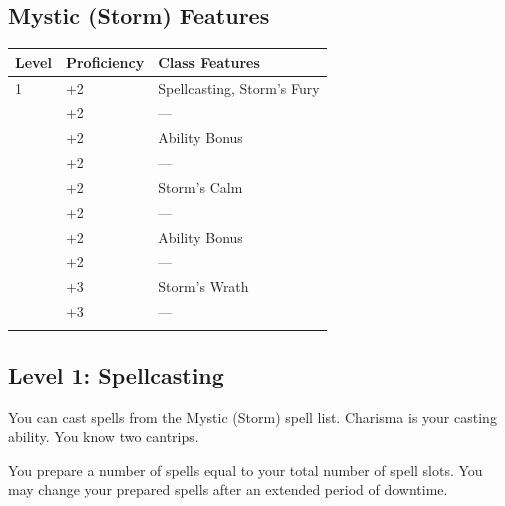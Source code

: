 \documentclass[12pt,letterpaper,twocolumn,openany,nodeprecatedcode,bg=none]{dndbook}
\let\oldsubsection\subsection
\renewcommand{\subsection}[1]{%
  \needspace{5\baselineskip}%
  \oldsubsection{#1}%
}
\begin{document}
\subsection{Mystic (Storm) Features}\label{mystic-storm-features}


{\def\LTcaptype{none} %
\begin{table}[!htbp]
\centering
\begin{tabular}{@{}
  >{\raggedright\arraybackslash}p{}
  >{\raggedright\arraybackslash}p{}
  >{\raggedright\arraybackslash}p{}@{}}
\toprule\noalign{}
\begin{minipage}[b]{\linewidth}\raggedright
Level
\end{minipage} & \begin{minipage}[b]{\linewidth}\raggedright
Proficiency
\end{minipage} & \begin{minipage}[b]{\linewidth}\raggedright
Class Features
\end{minipage} \\
\midrule\noalign{}
1 & +2 & Spellcasting, Storm's Fury \\
2 & +2 & --- \\
3 & +2 & Ability Bonus \\
4 & +2 & --- \\
5 & +2 & Storm's Calm \\
6 & +2 & --- \\
7 & +2 & Ability Bonus \\
8 & +2 & --- \\
9 & +3 & Storm's Wrath \\
10 & +3 & --- \\
\bottomrule\noalign{}
\end{tabular}
\end{table}
}

\subsection{Level 1: Spellcasting}\label{level-1-spellcasting}

You can cast spells from the Mystic (Storm) spell list. Charisma is your
casting ability. You know two cantrips.

You prepare a number of spells equal to your total number of spell
slots. You may change your prepared spells after an extended period of
downtime.
\end{document}
